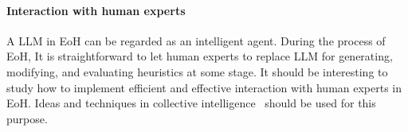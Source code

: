 

\paragraph{Interaction with human experts}
A LLM in EoH can be regarded as an intelligent agent. During the process of EoH, It is straightforward to let human experts to replace LLM for generating, modifying, and evaluating heuristics at some stage. It should be interesting to study how to implement efficient and effective interaction with human experts in EoH. Ideas and techniques in collective intelligence~\cite{malone2022handbook} should be used for this purpose.



\vspace{1pt}